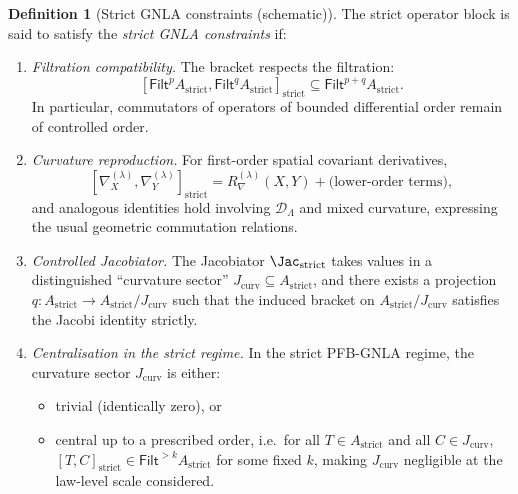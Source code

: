 \documentclass[11pt]{book}
\theoremstyle{plain}
\theoremstyle{definition}
\newtheorem{definition}[theorem]{Definition} \theoremstyle{remark}
\begin{document}
\begin{definition}[Strict GNLA constraints (schematic)]
The strict operator block is said to satisfy the \emph{strict GNLA
  constraints} if:
  \begin{enumerate}[label=(S\arabic*)]
    \item \emph{Filtration compatibility.}
          The bracket respects the filtration:
          \[
             [\mathsf{Filt}^pA_{\mathrm{strict}},
              \mathsf{Filt}^qA_{\mathrm{strict}}]_{\mathrm{strict}}
             \subseteq
             \mathsf{Filt}^{p+q}A_{\mathrm{strict}}.
          \]
          In particular, commutators of operators of bounded differential
          order remain of controlled order.
    \item \emph{Curvature reproduction.}
          For first-order spatial covariant derivatives,
          \[
             [\nabla^{(\lambda)}_X,\nabla^{(\lambda)}_Y]_{\mathrm{strict}}
             =
             R^{(\lambda)}_\nabla(X,Y)
             + \text{(lower-order terms)},
          \]
          and analogous identities hold involving
          $\mathcal{D}_{\Lambda}$ and mixed curvature, expressing the usual
          geometric commutation relations.
    \item \emph{Controlled Jacobiator.}
          The Jacobiator $\Jac_{\mathrm{strict}}$ takes values in a
          distinguished “curvature sector”
          $J_{\mathrm{curv}}\subseteq A_{\mathrm{strict}}$, and there
          exists a projection
          $q:A_{\mathrm{strict}}\to A_{\mathrm{strict}}/J_{\mathrm{curv}}$
          such that the induced bracket on
          $A_{\mathrm{strict}}/J_{\mathrm{curv}}$ satisfies the Jacobi
          identity strictly.
    \item \emph{Centralisation in the strict regime.}
          In the strict PFB-GNLA regime, the curvature sector
          $J_{\mathrm{curv}}$ is either:
          \begin{itemize}
            \item trivial (identically zero), or
            \item central up to a prescribed order, i.e.\ for all
                  $T\in A_{\mathrm{strict}}$ and all
                  $C\in J_{\mathrm{curv}}$,
                  \(
                     [T,C]_{\mathrm{strict}}
                     \in \mathsf{Filt}^{>k}A_{\mathrm{strict}}
                  \)
                  for some fixed $k$, making $J_{\mathrm{curv}}$
                  negligible at the law-level scale considered.
          \end{itemize}
  \end{enumerate}
\end{definition}
\end{document}
